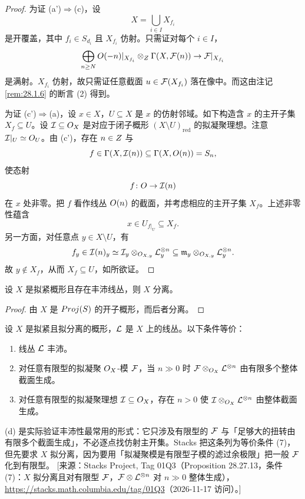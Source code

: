 \begin{proof}
为证 (a')$\Rightarrow$(c)，设
\[
X=\bigcup_{i\in I}X_{f_i}
\]
是开覆盖，其中 $f_i\in S_{d_i}$ 且 $X_{f_i}$ 仿射。只需证对每个 $i\in I$，
\[
\bigoplus_{n\ge N}O(-n)|_{X_{f_i}}\otimes_{Z}\Gamma(X,\mathcal{F}(n)) \to \mathcal{F}|_{X_{f_i}}
\]
是满射。$X_{f_i}$ 仿射，故只需证任意截面 $u\in\mathcal{F}(X_{f_i})$ 落在像中。而这由注记 \ref{rem:28.1.6} 的断言 (2) 得到。

为证 (c')$\Rightarrow$(a)，设 $x\in X$，$U\subseteq X$ 是 $x$ 的仿射邻域。如下构造含 $x$ 的主开子集 $X_f\subseteq U$。设 $\mathcal{I}\subseteq O_X$ 是对应于闭子概形 $(X\setminus U)_{\mathrm{red}}$ 的拟凝聚理想。注意 $\mathcal{I}|_U\simeq O_U$。由 (c')，存在 $n\in Z$ 与
\[
f\in\Gamma(X,\mathcal{I}(n))\subseteq\Gamma(X,O(n))=S_n,
\]
使态射
\[
f\colon O\to\mathcal{I}(n)
\]
在 $x$ 处非零。把 $f$ 看作线丛 $O(n)$ 的截面，并考虑相应的主开子集 $X_f$。上述非零性蕴含
\[
x\in U_{f|_U}\subseteq X_f.
\]
另一方面，对任意点 $y\in X\setminus U$，有
\[
f_y\in\mathcal{I}(n)_y\simeq\mathcal{I}_y\otimes_{O_{X,y}}\mathcal{L}_y^{\otimes n}\subseteq\mathfrak m_y\otimes_{O_{X,y}}\mathcal{L}_y^{\otimes n}.
\]
故 $y\notin X_f$，从而 $X_f\subseteq U$，如所欲证。
\end{proof}

\begin{lemma}\label{lem:28.3.2}
设 $X$ 是拟紧概形且存在丰沛线丛，则 $X$ 分离。
\end{lemma}

\begin{proof}
由 $X$ 是 $Proj(S)$ 的开子概形，而后者分离。
\end{proof}

\begin{proposition}\label{prop:28.3.3}
设 $X$ 是拟紧且拟分离的概形，$\mathcal{L}$ 是 $X$ 上的线丛。以下条件等价：
\begin{enumerate}[label=(\alph*),leftmargin=2.6em,itemsep=0.3ex]
  \item 线丛 $\mathcal{L}$ 丰沛。
  \item[\textup{(d)}] 对任意有限型的拟凝聚 $O_X$-模 $\mathcal{F}$，当 $n\gg 0$ 时 $\mathcal{F}\otimes_{O_X}\mathcal{L}^{\otimes n}$ 由有限多个整体截面生成。
  \item[\textup{(d')}] 对任意有限型的拟凝聚理想 $\mathcal{I}\subseteq O_X$，存在 $n>0$ 使 $\mathcal{I}\otimes_{O_X}\mathcal{L}^{\otimes n}$ 由整体截面生成。
\end{enumerate}
\end{proposition}

\begin{yizhu}
(d) 是实际验证丰沛性最常用的形式：它只涉及有限型的 $\mathcal{F}$ 与「足够大的扭转由有限多个截面生成」，不必逐点找仿射主开集。Stacks 把这条列为等价条件 (7)，但先要求 $X$ 拟分离，因为要用「拟凝聚模是有限型子模的滤过余极限」把一般 $\mathcal{F}$ 化到有限型。
[来源：Stacks Project, Tag 01Q3（Proposition 28.27.13，条件 (7)：$X$ 拟分离且对有限型 $\mathcal{F}$，$\mathcal{F}\otimes\mathcal{L}^{\otimes n}$ 对 $n\gg0$ 整体生成），\url{https://stacks.math.columbia.edu/tag/01Q3}（2026-11-17 访问）。]
\end{yizhu}

